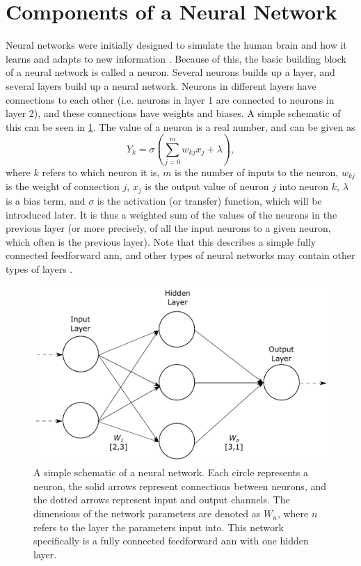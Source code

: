 \section{Components of a Neural Network}
\label{sec:ml:componentsofaneuralnetwork}
Neural networks were initially designed to simulate the human brain and how it learns and adapts to new information \cite{McCulloch1943}. Because of this, the basic building block of a neural network is called a neuron. Several neurons builds up a layer, and several layers build up a neural network. Neurons in different layers have connections to each other (i.e. neurons in layer 1 are connected to neurons in layer 2), and these connections have weights and biases. A simple schematic of this can be seen in \cref{fig:neuralnetwork}. The value of a neuron is a real number, and can be given as \cite[81]{Wang2003}
\begin{equation}
    \label{eq:neuron}
    Y_{k} = \sigma\left(\sum_{j=0}^{m}w_{kj}x_j + \lambda \right),
\end{equation}
where $k$ refers to which neuron it is, $m$ is the number of inputs to the neuron, $w_{kj}$ is the weight of connection $j$, $x_j$ is the output value of neuron $j$ into neuron $k$, $\lambda$ is a bias term, and $\sigma$ is the activation (or transfer) function, which will be introduced later. It is thus a weighted sum of the values of the neurons in the previous layer (or more precisely, of all the input neurons to a given neuron, which often is the previous layer). Note that this describes a simple fully connected feedforward \acrfull{ann}, and other types of neural networks may contain other types of layers \cite{oshea2015introduction}.

\begin{figure}[htbp]  
    \centering
    \includegraphics[width=.8\textwidth]{figures/neuralnetwork.pdf}
    \caption[Neural network example]{A simple schematic of a neural network. Each circle represents a neuron, the solid arrows represent connections between neurons, and the dotted arrows represent input and output channels. The dimensions of the network parameters are denoted as $W_n$, where $n$ refers to the layer the parameters input into. This network specifically is a fully connected feedforward \acrlong{ann} with one hidden layer. }
    \label{fig:neuralnetwork}
\end{figure}


